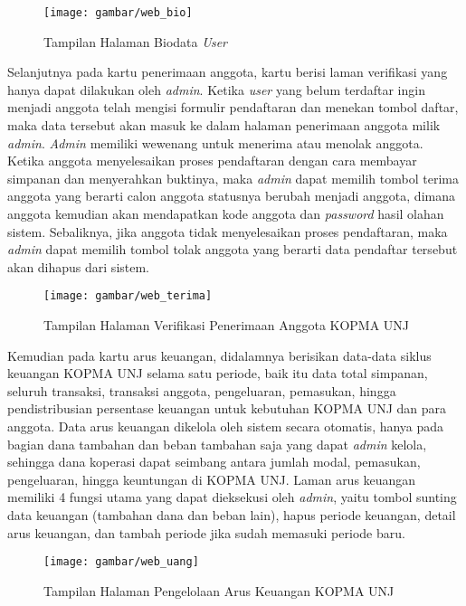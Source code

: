 \begin{figure}[H]
	\centering
	\texttt{[image: gambar/web\_bio]}
	\caption{Tampilan Halaman Biodata \textit{User}}
\end{figure} 

Selanjutnya pada kartu penerimaan anggota, kartu berisi laman verifikasi yang hanya dapat dilakukan oleh \textit{admin}. Ketika \textit{user} yang belum terdaftar ingin menjadi anggota telah mengisi formulir pendaftaran dan menekan tombol daftar, maka data tersebut akan masuk ke dalam halaman penerimaan anggota milik \textit{admin}. \textit{Admin} memiliki wewenang untuk menerima atau menolak anggota. Ketika anggota menyelesaikan proses pendaftaran dengan cara membayar simpanan dan menyerahkan buktinya, maka \textit{admin} dapat memilih tombol terima anggota yang berarti calon anggota statusnya berubah menjadi anggota, dimana anggota kemudian akan mendapatkan kode anggota dan \textit{password} hasil olahan sistem. Sebaliknya, jika anggota tidak menyelesaikan proses pendaftaran, maka \textit{admin} dapat memilih tombol tolak anggota yang berarti data pendaftar tersebut akan dihapus dari sistem.

\begin{figure}[H]
	\centering
	\texttt{[image: gambar/web\_terima]}
	\caption{Tampilan Halaman Verifikasi Penerimaan Anggota KOPMA UNJ}
\end{figure} 

Kemudian pada kartu arus keuangan, didalamnya berisikan data-data siklus keuangan KOPMA UNJ selama satu periode, baik itu data total simpanan, seluruh transaksi, transaksi anggota, pengeluaran, pemasukan, hingga pendistribusian persentase keuangan untuk kebutuhan KOPMA UNJ dan para anggota. Data arus keuangan dikelola oleh sistem secara otomatis, hanya pada bagian dana tambahan dan beban tambahan saja yang dapat \textit{admin} kelola, sehingga dana koperasi dapat seimbang antara jumlah modal, pemasukan, pengeluaran, hingga keuntungan di KOPMA UNJ. Laman arus keuangan memiliki 4 fungsi utama yang dapat dieksekusi oleh \textit{admin}, yaitu tombol sunting data keuangan (tambahan dana dan beban lain), hapus periode keuangan, detail arus keuangan, dan tambah periode jika sudah memasuki periode baru.

\begin{figure}[H]
	\centering
	\texttt{[image: gambar/web\_uang]}
	\caption{Tampilan Halaman Pengelolaan Arus Keuangan KOPMA UNJ}
\end{figure} 

